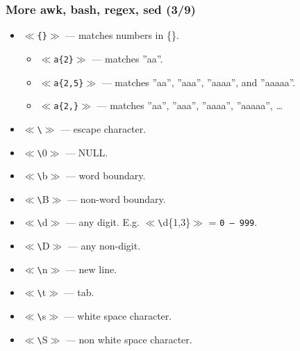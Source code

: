 \documentclass[aspectratio=169, xcolor=table, notheorems, hyperref={pdfpagelabels=false}]{beamer}
\begin{document}
\begin{frame}[fragile]
\frametitle{More awk, bash, regex, sed (3/9)}
\begin{itemize}
\item $\ll$\texttt{\{\}}$\gg$ --- matches numbers in \{\}.
\begin{itemize}
\item $\ll$\texttt{a\{2\}}$\gg$ --- matches ''aa''.
\item $\ll$\texttt{a\{2,5\}}$\gg$ --- matches ''aa'', ''aaa'', ''aaaa'', and ''aaaaa''.
\item $\ll$\texttt{a\{2,\}}$\gg$ --- matches ''aa'', ''aaa'', ''aaaa'', ''aaaaa'', \ldots
\end{itemize}
\item $\ll$\texttt{\textbackslash}$\gg$ --- escape character.
\item $\ll$\texttt{\textbackslash}0$\gg$ --- NULL.
\item $\ll$\texttt{\textbackslash}b$\gg$ --- word boundary.
\item $\ll$\texttt{\textbackslash}B$\gg$ --- non-word boundary.
\item $\ll$\texttt{\textbackslash}d$\gg$ --- any digit. E.g. $\ll$\texttt{\textbackslash}d\{1,3\}$\gg$
      = \texttt{0 -- 999}.
\item $\ll$\texttt{\textbackslash}D$\gg$ --- any non-digit.
\item $\ll$\texttt{\textbackslash}n$\gg$ --- new line.
\item $\ll$\texttt{\textbackslash}t$\gg$ --- tab.
\item $\ll$\texttt{\textbackslash}s$\gg$ --- white space character.
\item $\ll$\texttt{\textbackslash}S$\gg$ --- non white space character.
\end{itemize}
\end{frame}
\end{document}
